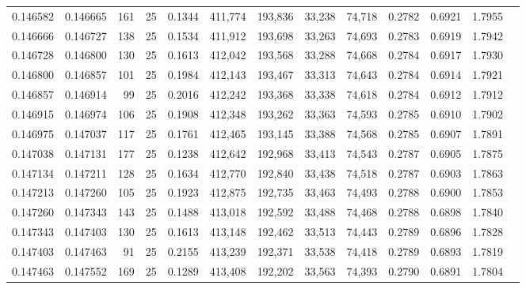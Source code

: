 \begin{tabular}{rrrrrrrrrrrrr}
0.146582 & 0.146665 &   161 &  25 &                                     0.1344 & 411,774 & 193,836 &  33,238 &  74,718 & 0.2782 & 0.6921 & 1.7955 \\
0.146666 & 0.146727 &   138 &  25 &                                     0.1534 & 411,912 & 193,698 &  33,263 &  74,693 & 0.2783 & 0.6919 & 1.7942 \\
0.146728 & 0.146800 &   130 &  25 &                                     0.1613 & 412,042 & 193,568 &  33,288 &  74,668 & 0.2784 & 0.6917 & 1.7930 \\
0.146800 & 0.146857 &   101 &  25 &                                     0.1984 & 412,143 & 193,467 &  33,313 &  74,643 & 0.2784 & 0.6914 & 1.7921 \\
0.146857 & 0.146914 &    99 &  25 &                                     0.2016 & 412,242 & 193,368 &  33,338 &  74,618 & 0.2784 & 0.6912 & 1.7912 \\
0.146915 & 0.146974 &   106 &  25 &                                     0.1908 & 412,348 & 193,262 &  33,363 &  74,593 & 0.2785 & 0.6910 & 1.7902 \\
0.146975 & 0.147037 &   117 &  25 &                                     0.1761 & 412,465 & 193,145 &  33,388 &  74,568 & 0.2785 & 0.6907 & 1.7891 \\
0.147038 & 0.147131 &   177 &  25 &                                     0.1238 & 412,642 & 192,968 &  33,413 &  74,543 & 0.2787 & 0.6905 & 1.7875 \\
0.147134 & 0.147211 &   128 &  25 &                                     0.1634 & 412,770 & 192,840 &  33,438 &  74,518 & 0.2787 & 0.6903 & 1.7863 \\
0.147213 & 0.147260 &   105 &  25 &                                     0.1923 & 412,875 & 192,735 &  33,463 &  74,493 & 0.2788 & 0.6900 & 1.7853 \\
0.147260 & 0.147343 &   143 &  25 &                                     0.1488 & 413,018 & 192,592 &  33,488 &  74,468 & 0.2788 & 0.6898 & 1.7840 \\
0.147343 & 0.147403 &   130 &  25 &                                     0.1613 & 413,148 & 192,462 &  33,513 &  74,443 & 0.2789 & 0.6896 & 1.7828 \\
0.147403 & 0.147463 &    91 &  25 &                                     0.2155 & 413,239 & 192,371 &  33,538 &  74,418 & 0.2789 & 0.6893 & 1.7819 \\
0.147463 & 0.147552 &   169 &  25 &                                     0.1289 & 413,408 & 192,202 &  33,563 &  74,393 & 0.2790 & 0.6891 & 1.7804 \\

\end{tabular}
